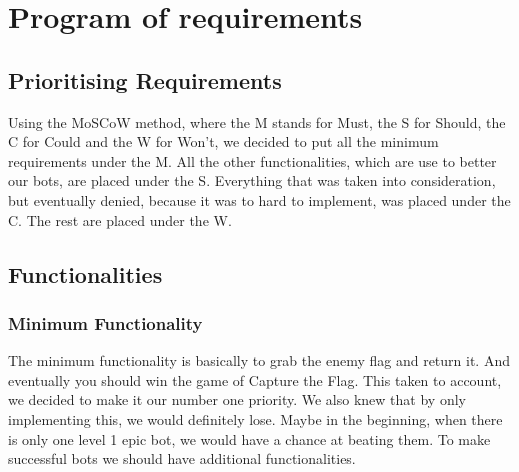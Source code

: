 \chapter{Program of requirements}
\section{Prioritising Requirements}
Using the MoSCoW method, where the M stands for Must, the S for Should, the C for Could and the W for Won't, we decided to put all the minimum requirements under the M. All the other functionalities, which are use to better our bots, are placed under the S. Everything that was taken into consideration, but eventually denied, because it was to hard to implement, was placed under the C. The rest are placed under the W.\\

\section{Functionalities}
\subsection{Minimum Functionality}
The minimum functionality is basically to grab the enemy flag and return it. And eventually you should win the game of Capture the Flag. This taken to account, we decided to make it our number one priority. We also knew that by only implementing this, we would definitely lose. Maybe in the beginning, when there is only one level 1 epic bot, we would have a chance at beating them. To make successful bots we should have additional functionalities.\\ 

